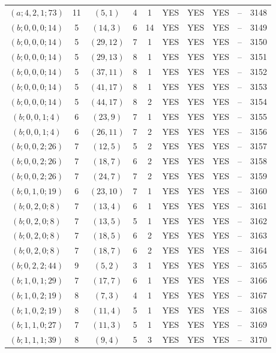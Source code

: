 \begin{longtable}{|c|c|c|c|c|c|c|c|c|c|}
$(a; 4, 2, 1; 73)$ & 11 & $(5, 1)$ & 4 & 1 & YES & YES & YES & -- & 3148\\
$(b; 0, 0, 0; 14)$ & 5 & $(14, 3)$ & 6 & 14 & YES & YES & YES & -- & 3149\\
$(b; 0, 0, 0; 14)$ & 5 & $(29, 12)$ & 7 & 1 & YES & YES & YES & -- & 3150\\
$(b; 0, 0, 0; 14)$ & 5 & $(29, 13)$ & 8 & 1 & YES & YES & YES & -- & 3151\\
$(b; 0, 0, 0; 14)$ & 5 & $(37, 11)$ & 8 & 1 & YES & YES & YES & -- & 3152\\
$(b; 0, 0, 0; 14)$ & 5 & $(41, 17)$ & 8 & 1 & YES & YES & YES & -- & 3153\\
$(b; 0, 0, 0; 14)$ & 5 & $(44, 17)$ & 8 & 2 & YES & YES & YES & -- & 3154\\
$(b; 0, 0, 1; 4)$ & 6 & $(23, 9)$ & 7 & 1 & YES & YES & YES & -- & 3155\\
$(b; 0, 0, 1; 4)$ & 6 & $(26, 11)$ & 7 & 2 & YES & YES & YES & -- & 3156\\
$(b; 0, 0, 2; 26)$ & 7 & $(12, 5)$ & 5 & 2 & YES & YES & YES & -- & 3157\\
$(b; 0, 0, 2; 26)$ & 7 & $(18, 7)$ & 6 & 2 & YES & YES & YES & -- & 3158\\
$(b; 0, 0, 2; 26)$ & 7 & $(24, 7)$ & 7 & 2 & YES & YES & YES & -- & 3159\\
$(b; 0, 1, 0; 19)$ & 6 & $(23, 10)$ & 7 & 1 & YES & YES & YES & -- & 3160\\
$(b; 0, 2, 0; 8)$ & 7 & $(13, 4)$ & 6 & 1 & YES & YES & YES & -- & 3161\\
$(b; 0, 2, 0; 8)$ & 7 & $(13, 5)$ & 5 & 1 & YES & YES & YES & -- & 3162\\
$(b; 0, 2, 0; 8)$ & 7 & $(18, 5)$ & 6 & 2 & YES & YES & YES & -- & 3163\\
$(b; 0, 2, 0; 8)$ & 7 & $(18, 7)$ & 6 & 2 & YES & YES & YES & -- & 3164\\
$(b; 0, 2, 2; 44)$ & 9 & $(5, 2)$ & 3 & 1 & YES & YES & YES & -- & 3165\\
$(b; 1, 0, 1; 29)$ & 7 & $(17, 7)$ & 6 & 1 & YES & YES & YES & -- & 3166\\
$(b; 1, 0, 2; 19)$ & 8 & $(7, 3)$ & 4 & 1 & YES & YES & YES & -- & 3167\\
$(b; 1, 0, 2; 19)$ & 8 & $(11, 4)$ & 5 & 1 & YES & YES & YES & -- & 3168\\
$(b; 1, 1, 0; 27)$ & 7 & $(11, 3)$ & 5 & 1 & YES & YES & YES & -- & 3169\\
$(b; 1, 1, 1; 39)$ & 8 & $(9, 4)$ & 5 & 3 & YES & YES & YES & -- & 3170\\

\end{longtable}

